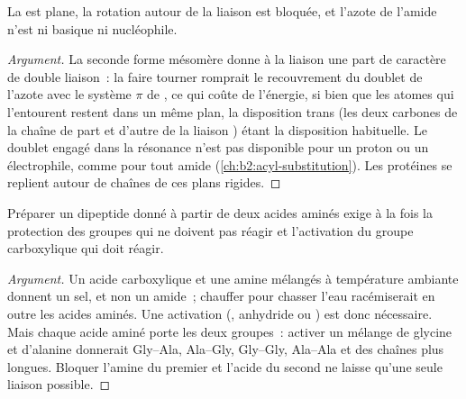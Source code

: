 \begin{proposition}\label{prop:b2:biomolecules:planar}
La  est plane, la rotation autour de la liaison  est bloquée, et l'azote de
l'amide n'est ni basique ni nucléophile.
\end{proposition}

\begin{proof}[Argument]
La seconde forme mésomère donne à la liaison  une part de caractère de double liaison~: la faire
tourner romprait le recouvrement du doublet de l'azote avec le système $\pi$ de , ce qui coûte de
l'énergie, si bien que les atomes qui l'entourent restent dans un même plan, la disposition trans (les
deux carbones de la chaîne de part et d'autre de la liaison ) étant la disposition habituelle.
Le doublet engagé dans la résonance n'est pas disponible pour un proton ou un électrophile, comme pour
tout amide (\cref{ch:b2:acyl-substitution}). Les protéines se replient autour de chaînes de ces plans rigides.
\end{proof}

\begin{proposition}\label{prop:b2:biomolecules:coupling}
Préparer un dipeptide donné à partir de deux acides aminés exige à la fois la protection des groupes qui
ne doivent pas réagir et l'activation du groupe carboxylique qui doit réagir.
\end{proposition}

\begin{proof}[Argument]
Un acide carboxylique et une amine mélangés à température ambiante donnent un sel, et non un amide~;
chauffer pour chasser l'eau racémiserait en outre les acides aminés. Une activation (,
anhydride ou ) est donc nécessaire. Mais chaque acide aminé porte les deux groupes~:
activer un mélange de glycine et d'alanine donnerait Gly--Ala, Ala--Gly, Gly--Gly, Ala--Ala et des
chaînes plus longues. Bloquer l'amine du premier et l'acide du second ne laisse qu'une seule liaison possible.
\end{proof}

